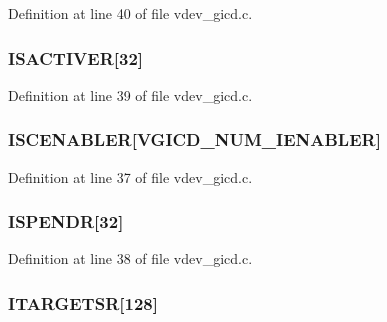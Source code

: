\-Definition at line 40 of file vdev\-\_\-gicd.\-c.

\hypertarget{structgicd__regs_ad809bb8e51b288887c0fed376ebe0a0e}{
\subsubsection[{\-I\-S\-A\-C\-T\-I\-V\-E\-R}]{ {\bf \-I\-S\-A\-C\-T\-I\-V\-E\-R}\mbox{[}32\mbox{]}}}\label{structgicd__regs_ad809bb8e51b288887c0fed376ebe0a0e}


\-Definition at line 39 of file vdev\-\_\-gicd.\-c.

\hypertarget{structgicd__regs_a0ab785c5a7595bf615bd278bac31f707}{
\subsubsection[{\-I\-S\-C\-E\-N\-A\-B\-L\-E\-R}]{ {\bf \-I\-S\-C\-E\-N\-A\-B\-L\-E\-R}\mbox{[}{\bf \-V\-G\-I\-C\-D\-\_\-\-N\-U\-M\-\_\-\-I\-E\-N\-A\-B\-L\-E\-R}\mbox{]}}}\label{structgicd__regs_a0ab785c5a7595bf615bd278bac31f707}


\-Definition at line 37 of file vdev\-\_\-gicd.\-c.

\hypertarget{structgicd__regs_a9033d910fcf42a540e7b8428b310a7e8}{
\subsubsection[{\-I\-S\-P\-E\-N\-D\-R}]{ {\bf \-I\-S\-P\-E\-N\-D\-R}\mbox{[}32\mbox{]}}}\label{structgicd__regs_a9033d910fcf42a540e7b8428b310a7e8}


\-Definition at line 38 of file vdev\-\_\-gicd.\-c.

\hypertarget{structgicd__regs_a4a30dbc1ce8c2c11682ba16ff36f9f16}{
\subsubsection[{\-I\-T\-A\-R\-G\-E\-T\-S\-R}]{ {\bf \-I\-T\-A\-R\-G\-E\-T\-S\-R}\mbox{[}128\mbox{]}}}\label{structgicd__regs_a4a30dbc1ce8c2c11682ba16ff36f9f16}


